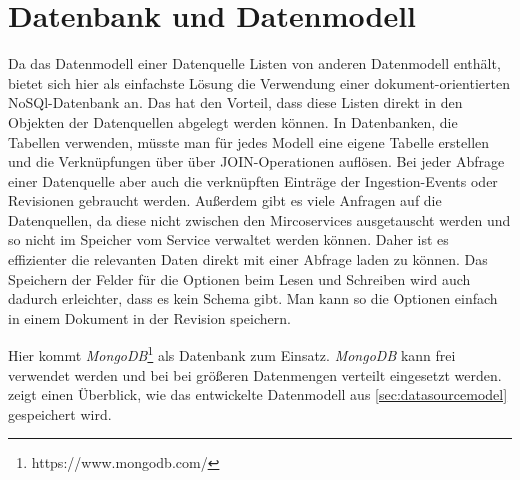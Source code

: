 \section{Datenbank und Datenmodell}

Da das Datenmodell einer Datenquelle Listen von anderen Datenmodell enthält, bietet sich hier als einfachste Lösung die Verwendung einer dokument-orientierten NoSQl-Datenbank an.
Das hat den Vorteil, dass diese Listen direkt in den Objekten der Datenquellen abgelegt werden können.
In Datenbanken, die Tabellen verwenden, müsste man für jedes Modell eine eigene Tabelle erstellen und die Verknüpfungen über über JOIN-Operationen auflösen.
Bei jeder Abfrage einer Datenquelle aber auch die verknüpften Einträge der Ingestion-Events oder Revisionen gebraucht werden.
Außerdem gibt es viele Anfragen auf die Datenquellen, da diese nicht zwischen den Mircoservices ausgetauscht werden und so nicht im Speicher vom Service verwaltet werden können.
Daher ist es effizienter die relevanten Daten direkt mit einer Abfrage laden zu können.
Das Speichern der Felder für die Optionen beim Lesen und Schreiben wird auch dadurch erleichter, dass es kein Schema gibt.
Man kann so die Optionen einfach in einem Dokument in der Revision speichern.

Hier kommt \textit{MongoDB}\footnote{https://www.mongodb.com/} als Datenbank zum Einsatz.
\textit{MongoDB} kann frei verwendet werden und bei bei größeren Datenmengen verteilt eingesetzt werden.
 zeigt einen Überblick, wie das entwickelte Datenmodell aus \ref{sec:datasourcemodel} gespeichert wird.
